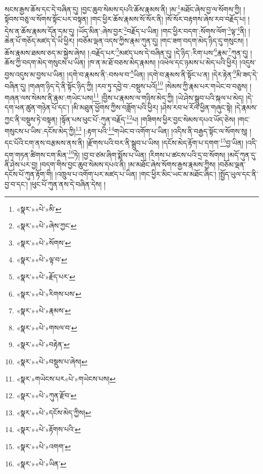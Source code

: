 སངས་རྒྱས་ཆོས་དང་དེ་བཞིན་དུ། །བྱང་ཆུབ་སེམས་དཔའི་ཆོས་རྣམས་ནི། །མ་\footnote{«སྣར་»«པེ་»མི་}མཐོང་ཞེས་བྱ་ལ་སོགས་ཀྱི། །སྟོབས་བཅུ་ལ་སོགས་སྟོང་པར་བསྟན། །གང་ཕྱིར་ཆོས་རྣམས་སོ་སོར་ནི། །སོ་སོར་བརྟགས་ཞེས་རབ་བརྗོད་པ། །དེས་ན་ཆོས་རྣམས་དོན་དམ་དུ། །ཡོད་མིན་:ཞེས་བྱར་\footnote{«སྣར་»«པེ་»ཞེས་ཀྱང་}བརྗོད་པ་ཡིན། །གང་ཕྱིར་བདག་:སོགས་ལོག་\footnote{«སྣར་»«པེ་»སོགས་}ལྟ་\footnote{«སྣར་»«པེ་»ལྟ་བ་}ནི། །ཆེན་པོ་གཅོད་མཛད་དེ་ཡི་ཕྱིར། །བཅོམ་ལྡན་འདས་ཀྱིས་རྣམ་ཀུན་དུ། །གང་ཟག་བདག་མེད་ཉིད་དུ་གསུངས། །ཆོས་རྣམས་ཐམས་ཅད་མ་སྐྱེས་ཞེས། །:བརྗོད་པར་\footnote{«སྣར་»«པེ་»རྗོད་པར་}མཛད་པས་དེ་བཞིན་དུ། །དེ་ཉིད་:རིག་པས་\footnote{«སྣར་»«པེ་»རིགས་པས་}རྣམ་\footnote{«སྣར་»«པེ་»རྣམས་}ཀུན་དུ། །ཆོས་ཀྱི་བདག་མེད་གསུངས་པ་ཡིན། །ཁ་ན་མ་ཐོ་བཅས་མེད་རྣམས། །འཕེལ་དང་ཉམས་པ་མེད་པའི་ཕྱིར། །འདུས་བྱས་འདུས་མ་བྱས་པ་ཡིན། །དགེ་བ་རྣམས་ནི་:བསལ་བ་\footnote{«སྣར་»«པེ་»གསལ་བ་}ཡིན། །དགེ་བ་རྣམས་ནི་སྟོང་པ་ན། །དེར་རྟེན་\footnote{«སྣར་»«པེ་»བརྟེན་}མི་ཟད་དེ་བཞིན་དུ། །གཞག་ཉིད་དེ་ནི་སྟོང་ཉིད་ཀྱི། །རབ་ཏུ་དབྱེ་བ་:བསྡུས་པའོ།\footnote{«སྣར་»«པེ་»བསྡུས་པ་ཞེས།} །སེམས་ཀྱི་རྣམ་པར་གཡེང་བ་བཅུས། །གཞན་ལས་སེམས་ནི་རྣམ་:གཡེང་པས།\footnote{«སྣར་»གཡེངས་པར«པེ་»གཡེངས་པས།} །བྱིས་པ་རྣམས་ལ་གཉིས་མེད་ཀྱི། །ཡེ་ཤེས་སྒྲུབ་པའི་སྐལ་པ་མེད། །དེ་དག་ཕན་ཚུན་གཉེན་པོ་དང་། །མི་མཐུན་ཕྱོགས་ཀྱིས་བཟློག་པའི་ཕྱིར། །ཤེས་རབ་ཕ་རོལ་ཕྱིན་གཞུང་སྟེ། །དེ་རྣམས་ཀྱང་ནི་བསྡུས་ཏེ་བསྟན། །སྟོན་པས་ཕུང་པོ་:ཀུན་བརྗོད་\footnote{«སྣར་»«པེ་»ཀུན་རྫོབ་}པ། །གཟིགས་ཕྱིར་བྱང་སེམས་དཔའ་ཡོད་ཅེས། །གང་གསུངས་པ་ཡིས་:དངོས་མེད་ཀྱི།\footnote{«སྣར་»«པེ་»དངོས་མེད་ཀྱིས།} །:རྟག་པའི་\footnote{«སྣར་»«པེ་»རྟོགས་པའི་}གཡེང་བ་འགོག་པ་ཡིན། །འདིས་ནི་བརྒྱད་སྟོང་ལ་སོགས་སུ། །དང་པོའི་ངག་ནས་བརྩམས་ནས་ནི། །རྫོགས་པའི་བར་ནི་སྒྲུབ་པ་ཡིས། །དངོས་མེད་རྟོག་པ་དགག་\footnote{«སྣར་»«པེ་»འགག་}བྱ་ཡིན། །འདི་དག་གཏན་ཚིགས་ངག་མིན་\footnote{«སྣར་»«པེ་»ཡིན་}ཏེ། །བྱ་བ་ཙམ་ཞིག་སྨོས་པ་ཡིན། །རིགས་པ་ཚངས་པའི་དྲ་བ་སོགས། །མདོ་ཀུན་དུ་ནི་ཤེས་པར་བྱ། །བདག་གིས་བྱང་ཆུབ་སེམས་དཔའ་ནི། །མ་མཐོང་ཞེས་སོགས་རྒྱས་རྣམས་ཀྱིས། །བཅོམ་ལྡན་དངོས་པོ་ཀུན་རྟོག་གི། །འཁྲུལ་པ་འགོག་པར་མཛད་པ་ཡིན། །གང་ཕྱིར་མིང་ཡང་མ་མཐོང་ཞིང་། །སྤྱོད་ཡུལ་དང་ནི་བྱ་བ་དང་། །ཕུང་པོ་ཀུན་ནས་དེ་བཞིན་དེས། །
